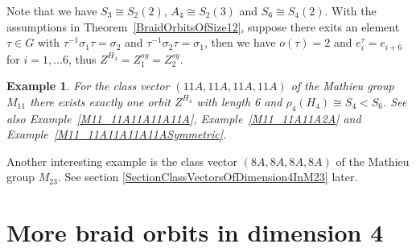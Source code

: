 \documentclass[12pt,a4paper]{article}
\newtheorem{example}{Example}[section]
\numberwithin{equation}{section}
\numberwithin{table}{section}
\begin{document}
%
\noindent
Note that we have $S_3 \cong S_2(2)$, $A_4 \cong S_2(3) $ and $S_6 \cong S_4(2)$.
With the assumptions in Theorem~\ref{BraidOrbitsOfSize12}, suppose there exits an element $\tau \in G$
with $\tau^{-1} \sigma_1 \tau = \sigma_2$ and $\tau^{-1} \sigma_2 \tau = \sigma_1$, then we
have $o(\tau)=2$ and $e^{\tau}_i = e_{i+6}$ for $i=1,\dots 6$,
thus $Z^{H_4} = Z^{sy}_1 = Z^{sy}_2$.
%
\begin{example}
\label{M11_11A11A11A11ASymmetricContinued}
For the class vector $(11A,11A,11A,11A)$ of the Mathieu group $M_{11}$ there exists exactly
one orbit $Z^{H_4}$ with length 6 and $\rho_4(H_4) \cong S_4 < S_6$.
See also Example~\ref{M11_11A11A11A11A}, Example~\ref{M11_11A11A2A} and Example~\ref{M11_11A11A11A11ASymmetric}.
\end{example}
%
\noindent
Another interesting example is the class vector $(8A,8A,8A,8A)$ of the Mathieu group $M_{23}$.
See section \ref{SectionClassVectorsOfDimension4InM23} later.

\section{More braid orbits in dimension 4}\label{SectionMoreBraidOrbits}
\end{document}
